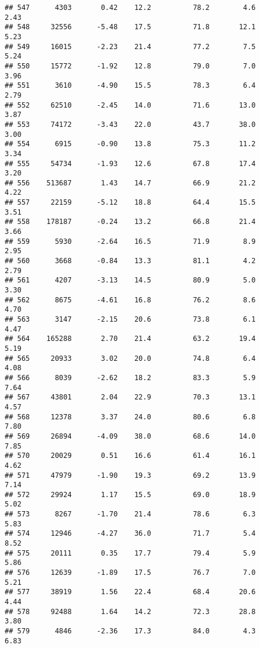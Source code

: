 \documentclass[
]{article}
\begin{document}
\begin{verbatim}
## 547      4303       0.42    12.2          78.2        4.6              2.43
## 548     32556      -5.48    17.5          71.8       12.1              5.23
## 549     16015      -2.23    21.4          77.2        7.5              5.24
## 550     15772      -1.92    12.8          79.0        7.0              3.96
## 551      3610      -4.90    15.5          78.3        6.4              2.79
## 552     62510      -2.45    14.0          71.6       13.0              3.87
## 553     74172      -3.43    22.0          43.7       38.0              3.00
## 554      6915      -0.90    13.8          75.3       11.2              3.34
## 555     54734      -1.93    12.6          67.8       17.4              3.20
## 556    513687       1.43    14.7          66.9       21.2              4.22
## 557     22159      -5.12    18.8          64.4       15.5              3.51
## 558    178187      -0.24    13.2          66.8       21.4              3.66
## 559      5930      -2.64    16.5          71.9        8.9              2.95
## 560      3668      -0.84    13.3          81.1        4.2              2.79
## 561      4207      -3.13    14.5          80.9        5.0              3.30
## 562      8675      -4.61    16.8          76.2        8.6              4.70
## 563      3147      -2.15    20.6          73.8        6.1              4.47
## 564    165288       2.70    21.4          63.2       19.4              5.19
## 565     20933       3.02    20.0          74.8        6.4              4.08
## 566      8039      -2.62    18.2          83.3        5.9              7.64
## 567     43801       2.04    22.9          70.3       13.1              4.57
## 568     12378       3.37    24.0          80.6        6.8              7.80
## 569     26894      -4.09    38.0          68.6       14.0              7.85
## 570     20029       0.51    16.6          61.4       16.1              4.62
## 571     47979      -1.90    19.3          69.2       13.9              7.14
## 572     29924       1.17    15.5          69.0       18.9              5.02
## 573      8267      -1.70    21.4          78.6        6.3              5.83
## 574     12946      -4.27    36.0          71.7        5.4              8.52
## 575     20111       0.35    17.7          79.4        5.9              5.86
## 576     12639      -1.89    17.5          76.7        7.0              5.21
## 577     38919       1.56    22.4          68.4       20.6              4.44
## 578     92488       1.64    14.2          72.3       28.8              3.80
## 579      4846      -2.36    17.3          84.0        4.3              6.83

\end{verbatim}
\end{document}
